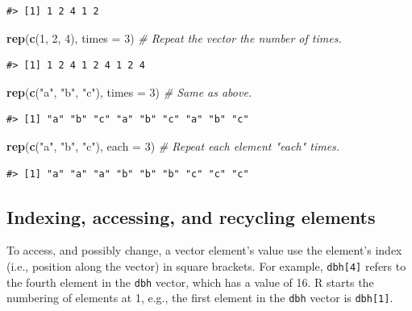 \documentclass[
  11pt,
]{krantz}
\newenvironment{Shaded}{\begin{snugshade}}{\end{snugshade}}
\newcommand{\CommentTok}[1]{\textcolor[rgb]{0.56,0.35,0.01}{\textit{#1}}}
\newcommand{\DataTypeTok}[1]{\textcolor[rgb]{0.13,0.29,0.53}{#1}}
\newcommand{\DecValTok}[1]{\textcolor[rgb]{0.00,0.00,0.81}{#1}}
\newcommand{\KeywordTok}[1]{\textcolor[rgb]{0.13,0.29,0.53}{\textbf{#1}}}
\newcommand{\NormalTok}[1]{#1}
\newcommand{\StringTok}[1]{\textcolor[rgb]{0.31,0.60,0.02}{#1}}
\theoremstyle{definition}
\theoremstyle{definition}
\theoremstyle{definition}
\theoremstyle{definition}
\theoremstyle{remark}
\begin{document}
\begin{verbatim}
#> [1] 1 2 4 1 2
\end{verbatim}

\begin{Shaded}
\begin{Highlighting}[]
\KeywordTok{rep}\NormalTok{(}\KeywordTok{c}\NormalTok{(}\DecValTok{1}\NormalTok{, }\DecValTok{2}\NormalTok{, }\DecValTok{4}\NormalTok{), }\DataTypeTok{times =} \DecValTok{3}\NormalTok{) }\CommentTok{\# Repeat the vector the number of times.}
\end{Highlighting}
\end{Shaded}

\begin{verbatim}
#> [1] 1 2 4 1 2 4 1 2 4
\end{verbatim}

\begin{Shaded}
\begin{Highlighting}[]
\KeywordTok{rep}\NormalTok{(}\KeywordTok{c}\NormalTok{(}\StringTok{"a"}\NormalTok{, }\StringTok{"b"}\NormalTok{, }\StringTok{"c"}\NormalTok{), }\DataTypeTok{times =} \DecValTok{3}\NormalTok{) }\CommentTok{\# Same as above.}
\end{Highlighting}
\end{Shaded}

\begin{verbatim}
#> [1] "a" "b" "c" "a" "b" "c" "a" "b" "c"
\end{verbatim}

\begin{Shaded}
\begin{Highlighting}[]
\KeywordTok{rep}\NormalTok{(}\KeywordTok{c}\NormalTok{(}\StringTok{"a"}\NormalTok{, }\StringTok{"b"}\NormalTok{, }\StringTok{"c"}\NormalTok{), }\DataTypeTok{each =} \DecValTok{3}\NormalTok{) }\CommentTok{\# Repeat each element "each" times.}
\end{Highlighting}
\end{Shaded}

\begin{verbatim}
#> [1] "a" "a" "a" "b" "b" "b" "c" "c" "c"
\end{verbatim}

\hypertarget{basicSubsetting}{%
\subsection{Indexing, accessing, and recycling elements}\label{basicSubsetting}}

To access, and possibly change, a vector element's value use the element's index (i.e., position along the vector) in square brackets. For example, \texttt{dbh{[}4{]}} refers to the fourth element in the \texttt{dbh} vector, which has a value of 16. R starts the numbering of elements at 1, e.g., the first element in the \texttt{dbh} vector is \texttt{dbh{[}1{]}}.
\end{document}
